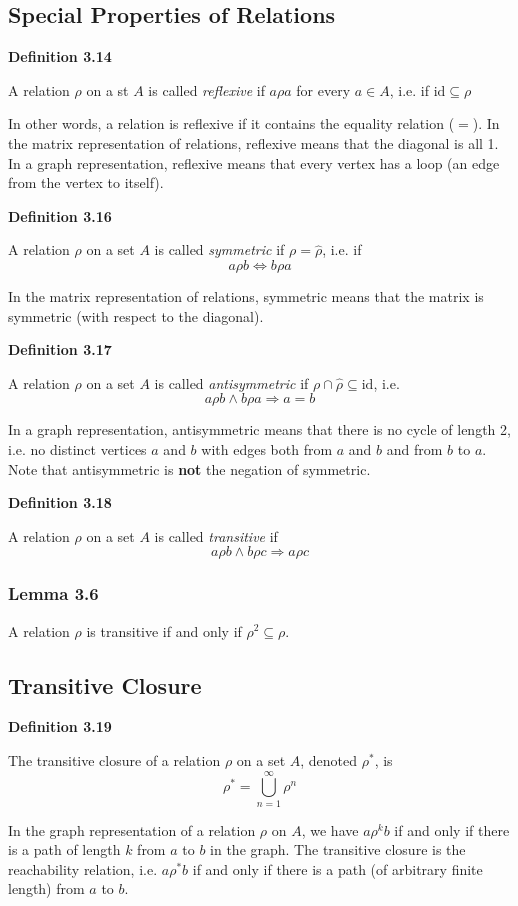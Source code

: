 \documentclass[a4paper]{report}
\newenvironment{definition}[1]{\begin{framed}\centerline{\textbf{Definition #1}}\noindent\hspace{-1.1mm}}{\end{framed}}
\begin{document}
\subsection{Special Properties of Relations}
\begin{definition}{3.14}
A relation $\rho$ on a st $A$ is called \emph{reflexive} if $a\rho a$ for every $a\in A$, i.e. if $\text{id}\subseteq\rho$
\end{definition}
In other words, a relation is reflexive if it contains the equality relation ($=$). In the matrix representation of relations, reflexive means that the diagonal is all 1. In a graph representation, reflexive means that every vertex has a loop (an edge from the vertex to itself).

\begin{definition}{3.16}
A relation $\rho$ on a set $A$ is called \emph{symmetric} if $\rho=\widehat{\rho}$, i.e. if \[a\rho b\Longleftrightarrow b\rho a\]
\end{definition}
In the matrix representation of relations, symmetric means that the matrix is symmetric (with respect to the diagonal).

\begin{definition}{3.17}
A relation $\rho$ on a set $A$ is called \emph{antisymmetric} if $\rho\cap\widehat{\rho}\subseteq\text{id}$, i.e. \[a\rho b\land b\rho a\Longrightarrow a=b\]
\end{definition}
In a graph representation, antisymmetric means that there is no cycle of length 2, i.e. no distinct vertices $a$ and $b$ with edges both from $a$ and $b$ and from $b$ to $a$. Note that antisymmetric is \textbf{not} the negation of symmetric. 

\begin{definition}{3.18}
A relation $\rho$ on a set $A$ is called \emph{transitive} if \[a\rho b\land b\rho c\Longrightarrow a\rho c\]
\end{definition}

\subsubsection*{Lemma 3.6}
A relation $\rho$ is transitive if and only if $\rho^2\subseteq\rho$.

\subsection{Transitive Closure}
\begin{definition}{3.19}
The transitive closure of a relation $\rho$ on a set $A$, denoted $\rho^*$, is \[{\rho ^*} = \bigcup\limits_{n = 1}^\infty  {{\rho ^n}} \]
\end{definition}
In the graph representation of a relation $\rho$ on $A$, we have $a\rho^k b$ if and only if there is a path of length $k$ from $a$ to $b$ in the graph. The transitive closure is the reachability relation, i.e. $a\rho^* b$ if and only if there is a path (of arbitrary finite length) from $a$ to $b$.
\end{document}
